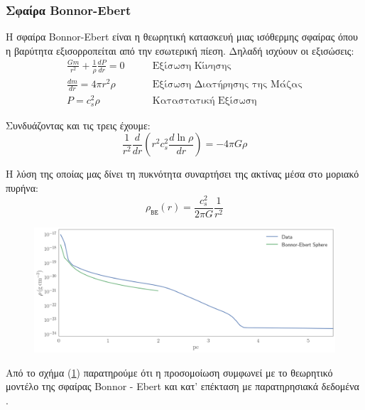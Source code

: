 	\subsubsection{Σφαίρα Bonnor-Ebert}
	Η σφαίρα Bonnor-Ebert είναι η θεωρητική κατασκευή μιας ισόθερμης σφαίρας όπου η βαρύτητα εξισορροπείται από την εσωτερική πίεση. Δηλαδή ισχύουν οι εξισώσεις:
	\begin{align}
	\frac{Gm}{r^2} +\frac{1}{\rho}\frac{dP}{dr}=0  &\qquad \text{Εξίσωση Κίνησης}\\
	\frac{dm}{dr} = 4 \pi r^2 \rho &\qquad \text{Εξίσωση Διατήρησης της Μάζας}\\
	P = c_s ^2 \rho &\qquad \text{Καταστατική Εξίσωση}
	\end{align}
	
	Συνδυάζοντας και τις τρεις έχουμε:
	\begin{equation}
	\frac{1}{r^2}\frac{d}{dr} \left( r^2 c_s ^2 \frac{d \ln \rho}{dr}\right)  = -4 \pi G \rho
	\end{equation}
	
	Η λύση της οποίας μας δίνει τη πυκνότητα συναρτήσει της ακτίνας μέσα στο μοριακό πυρήνα:
	\begin{equation}
	\label{eq:B-E_density}
	\rho _\mathtt{BE}(r) =\frac{c_s ^2}{2 \pi G} \frac{1}{r^2}
	\end{equation}
	
\begin{figure}[h]
	\centering
	\includegraphics[width=1\linewidth]{DataImages/H2CoolGRHOprofile-BE}
	\caption{}
	\label{fig:h2coolgrhoprofile-be}
\end{figure}
	
	Από το σχήμα (\ref{fig:h2coolgrhoprofile-be}) παρατηρούμε ότι η προσομοίωση συμφωνεί με το θεωρητικό μοντέλο της σφαίρας Bonnor - Ebert και κατ' επέκταση με παρατηρησιακά δεδομένα .  
	